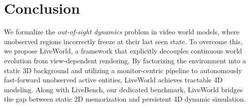 

\vspace{-1mm}
\section{Conclusion}
We formalize the \textit{out-of-sight dynamics} problem in video world models, where unobserved regions incorrectly freeze at their last seen state. To overcome this, we propose LiveWorld, a framework that explicitly decouples continuous world evolution from view-dependent rendering. By factorizing the environment into a static 3D background and utilizing a monitor-centric pipeline to autonomously fast-forward unobserved active entities, LiveWorld achieves tractable 4D modeling. Along with LiveBench, our dedicated benchmark, LiveWorld bridges the gap between static 2D memorization and persistent 4D dynamic simulation.